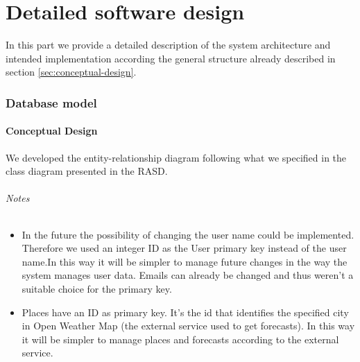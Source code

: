 \documentclass[10pt,a4paper,titlepage]{article}
\begin{document}
\clearpage
\part{Detailed software design}
\label{part:detailed-software-design}
In this part we provide a detailed description of the system architecture and intended implementation according the general structure already described in section \ref{sec:conceptual-design}.

\section{Database model}
\label{sec:DatabaseModel}
\subsection{Conceptual Design}
We developed the entity-relationship diagram following what we specified in the class diagram presented in the RASD. 
\paragraph{Notes}
\begin{itemize}
\item In the future the possibility of changing the user name could be implemented. Therefore we used an integer ID as the User primary key instead of the user name.In this way it will be simpler to manage future changes in the way the system manages user data. 
Emails can already be changed and thus weren't a suitable choice for the primary key.
\item Places have an ID as primary key. It's the id that identifies the specified city in Open Weather Map (the external service used to get forecasts). In this way it will be simpler to manage places and forecasts according to the external service.   
\end{itemize}
\end{document}
